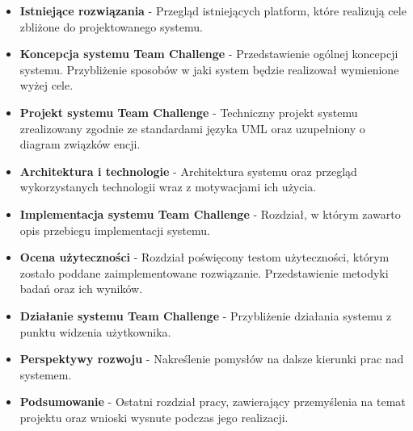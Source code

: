 \begin{itemize}

\item \textbf{Istniejące rozwiązania} - Przegląd istniejących platform, które realizują cele zbliżone do projektowanego systemu.  \\

\item \textbf{Koncepcja systemu Team Challenge} - Przedstawienie ogólnej koncepcji systemu. Przybliżenie sposobów w jaki system będzie realizował wymienione wyżej cele.   \\

\item \textbf{Projekt systemu Team Challenge} - Techniczny projekt systemu zrealizowany zgodnie ze standardami języka UML oraz uzupełniony o diagram związków encji. \\

\item \textbf{Architektura i technologie} - Architektura systemu oraz przegląd wykorzystanych technologii wraz z motywacjami ich użycia.  \\

\item \textbf{Implementacja systemu Team Challenge} - Rozdział, w którym zawarto opis przebiegu implementacji systemu.   \\

\item \textbf{Ocena użyteczności} - Rozdział poświęcony testom użyteczności, którym zostało poddane zaimplementowane rozwiązanie.  Przedstawienie metodyki badań oraz ich wyników. \\

\item \textbf{Działanie systemu Team Challenge} - Przybliżenie działania systemu z punktu widzenia użytkownika.   \\

\item \textbf{Perspektywy rozwoju} - Nakreślenie pomysłów na dalsze kierunki prac nad systemem.  \\

\item \textbf{Podsumowanie} - Ostatni rozdział pracy, zawierający przemyślenia na temat projektu oraz wnioski wysnute podczas jego realizacji.  \\

\end{itemize}


